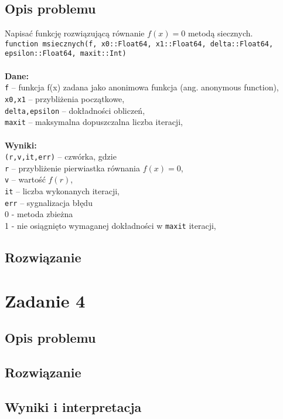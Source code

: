 \documentclass[a4paper]{article}
\newcommand\tab[1][1cm]{\hspace*{#1}}
\begin{document}
    \subsection{Opis problemu}
    Napisać funkcję rozwiązującą równanie $f(x) = 0$ metodą siecznych. \\
    \texttt{function msiecznych(f, x0::Float64, x1::Float64, delta::Float64, epsilon::Float64, maxit::Int)}
    \\\\
    \textbf{Dane:}\\
    \texttt{f} – funkcja f(x) zadana jako anonimowa funkcja (ang. anonymous function), \\
    \texttt{x0,x1} – przybliżenia początkowe, \\
    \texttt{delta,epsilon} – dokładności obliczeń, \\
    \texttt{maxit} – maksymalna dopuszczalna liczba iteracji, \\\\
    \textbf{Wyniki:}\\
    \texttt{(r,v,it,err)} – czwórka, gdzie \\
    \tab \texttt{r} – przybliżenie pierwiastka równania $f(x) = 0$, \\
    \tab \texttt{v} – wartość $f(r)$, \\
    \tab \texttt{it} – liczba wykonanych iteracji, \\
    \tab \texttt{err} – sygnalizacja błędu\\
    \tab \tab 0 - metoda zbieżna \\
    \tab \tab 1 - nie osiągnięto wymaganej dokładności w \texttt{maxit} iteracji, \\
    
    \subsection{Rozwiązanie}
    
\section{Zadanie 4}
    \subsection{Opis problemu}
    \subsection{Rozwiązanie}
    \subsection{Wyniki i interpretacja}
\end{document}
